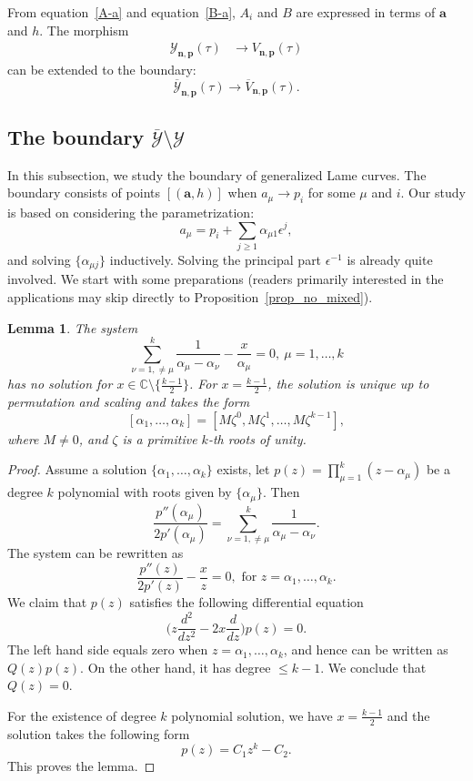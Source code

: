 \documentclass[11pt]{amsart}
\newtheorem{lemma}[theorem]{Lemma}
\theoremstyle{remark}
\numberwithin{equation}{section}
\begin{document}
From equation~\eqref{A-a} and equation~\eqref{B-a}, $A_i$ and $B$ are expressed in terms of $\mathbf{a}$ and $h$. The morphism
\[
\begin{split}
     \mathcal{Y}_{\mathbf{n},\mathbf{p}}(\tau) & \rightarrow V_{\mathbf{n},\mathbf{p}}(\tau) 
\end{split}
\]
can be extended to the boundary:
\[
    \overline{\mathcal{Y}}_{\mathbf{n},\mathbf{p}}(\tau) \rightarrow \overline{V}_{\mathbf{n},\mathbf{p}}(\tau). 
\]
\subsection{The boundary $\overline{\mathcal{Y}} \setminus \mathcal{Y}$}
In this subsection, we study the boundary of generalized Lame curves. The boundary consists of points $[(\mathbf{a}, h)]$ when $a_\mu \rightarrow p_i$ for some $\mu$ and $i$. Our study is based on considering the parametrization:
\[
    a_\mu = p_i + \sum_{j \geq 1} \alpha_{\mu 1} \epsilon^j,
\]
and solving $\{ \alpha_{\mu j} \}$ inductively. Solving the principal part $\epsilon^{-1}$ is already quite involved. We start with some preparations (readers primarily interested in the applications may skip directly to Proposition~\ref{prop_no_mixed}).
\begin{lemma} \label{Lemma_sol_x} The system
\[
    \sum_{\nu=1,\neq \mu}^k \frac{1}{\alpha_\mu - \alpha_\nu} - \frac{x}{\alpha_{\mu}}=0, \ \mu=1,\dots,k
\]
has no solution for $x \in \mathbb{C} \setminus \{ \frac{k-1}{2} \}$. For $x = \frac{k-1}{2}$, the solution is unique up to permutation and scaling and takes the form
\[
    [ \alpha_1,\dots,\alpha_k ] = [ M\zeta^0, M\zeta^1,\dots,M\zeta^{k-1} ],
\]
where $M \neq 0$, and $\zeta$ is a primitive $k$-th roots of unity.
\end{lemma}
\begin{proof}
Assume a solution $\{ \alpha_1,\dots,\alpha_k \}$ exists,
let $p(z) = \prod_{\mu=1}^k (z- \alpha_\mu)$ be a degree $k$ polynomial with roots given by $\{ \alpha_\mu \}$. Then
\[
    \frac{p''(\alpha_\mu)}{2p'(\alpha_\mu)} = \sum_{\nu=1,\neq \mu}^k \frac{1}{\alpha_\mu - \alpha_\nu}.
\]
The system can be rewritten as
\[
    \frac{p''(z)}{2p'(z)} - \frac{x}{z}  = 0, \text{ for }z=\alpha_1,\dots,\alpha_k.
\]
We claim that $p(z)$ satisfies the following differential equation
\[
    \Big(z \frac{d^2}{dz^2} - 2x \frac{d}{dz} \Big) p(z) = 0.
\]
The left hand side equals zero when $z = \alpha_1,\dots,\alpha_k$, and hence can be written as $Q(z)p(z)$. On the other hand, it has degree $\leq k-1$. We conclude that $Q(z)=0$. 

For the existence of degree $k$ polynomial solution, we have $x = \frac{k-1}{2}$ and the solution takes the following form 
\[
    p(z) = C_1 z^k - C_2. 
\]
This proves the lemma.
\end{proof}
\end{document}
